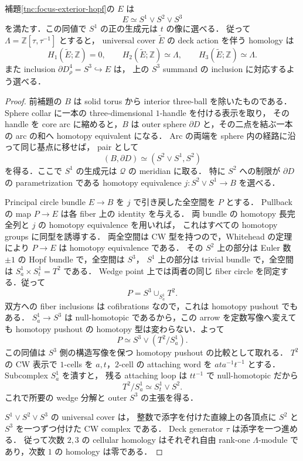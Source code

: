 \begin{proposition}
\label{tnc:focus-exterior-homotopy}
補題\ref{tnc:focus-exterior-hopf}の $E$ は
\[
 \boxed{E\simeq S^1\vee S^2\vee S^3}
\]
を満たす．この同値で $S^1$ の正の生成元は $t$ の像に選べる．
従って $\Lambda=\mathbb Z[\tau,\tau^{-1}]$ とすると，
universal cover $\widetilde E$ の deck action を伴う homology は
\[
 H_1(\widetilde E;\mathbb Z)=0,\qquad
 H_2(\widetilde E;\mathbb Z)\simeq\Lambda,
 \qquad H_3(\widetilde E;\mathbb Z)\simeq\Lambda.
\]
また inclusion $\partial D^4_\rho=S^3\hookrightarrow E$ は，
上の $S^3$ summand の inclusion に対応するよう選べる．
\end{proposition}

\begin{proof}
前補題の $B$ は solid torus から interior three-ball を除いたものである．
Sphere collar に一本の three-dimensional $1$-handle を付ける表示を取り，
その handle を core arc に縮めると，$B$ は outer sphere $\partial D$
と，その二点を結ぶ一本の arc の和へ homotopy equivalent になる．
Arc の両端を sphere 内の経路に沿って同じ基点に移せば，
pair として
\[
 (B,\partial D)\simeq(S^2\vee S^1,S^2)
\]
を得る．ここで $S^1$ の生成元は $\mathcal Q$ の meridian に取る．
特に $S^2$ への制限が $\partial D$ の parametrization である
homotopy equivalence $j:S^2\vee S^1\to B$ を選べる．

Principal circle bundle $E\to B$ を $j$ で引き戻した全空間を $P$ とする．
Pullback の map $P\to E$ は各 fiber 上の identity を与える．
両 bundle の homotopy 長完全列と $j$ の homotopy equivalence を用いれば，
これはすべての homotopy groups に同型を誘導する．
両全空間は CW 型を持つので，Whitehead の定理により
$P\to E$ は homotopy equivalence である．
その $S^2$ 上の部分は Euler 数 $\pm1$ の Hopf bundle で，全空間は $S^3$，
$S^1$ 上の部分は trivial bundle で，全空間は $S^1_a\times S^1_t=T^2$ である．
Wedge point 上では両者の同じ fiber circle を同定する．従って
\[
 P=S^3\cup_{S^1_a}T^2.
\]
双方への fiber inclusions は cofibrations なので，これは homotopy pushout でもある．
$S^1_a\to S^3$ は null-homotopic であるから，この arrow を定数写像へ変えても
homotopy pushout の homotopy 型は変わらない．よって
\[
 P\simeq S^3\vee(T^2/S^1_a).
\]
この同値は $S^3$ 側の構造写像を保つ homotopy pushout の比較として取れる．
$T^2$ の CW 表示で $1$-cells を $a,t$，$2$-cell の attaching word を
$ata^{-1}t^{-1}$ とする．Subcomplex $S^1_a$ を潰すと，
残る attaching loop は $tt^{-1}$ で null-homotopic だから
\[
 T^2/S^1_a\simeq S^1_t\vee S^2.
\]
これで所要の wedge 分解と outer $S^3$ の主張を得る．

$S^1\vee S^2\vee S^3$ の universal cover は，
整数で添字を付けた直線上の各頂点に $S^2$ と $S^3$ を一つずつ付けた CW complex である．
Deck generator $\tau$ は添字を一つ進める．
従って次数 $2,3$ の cellular homology はそれぞれ自由 rank-one
$\Lambda$-module であり，次数 $1$ の homology は零である．
\end{proof}

